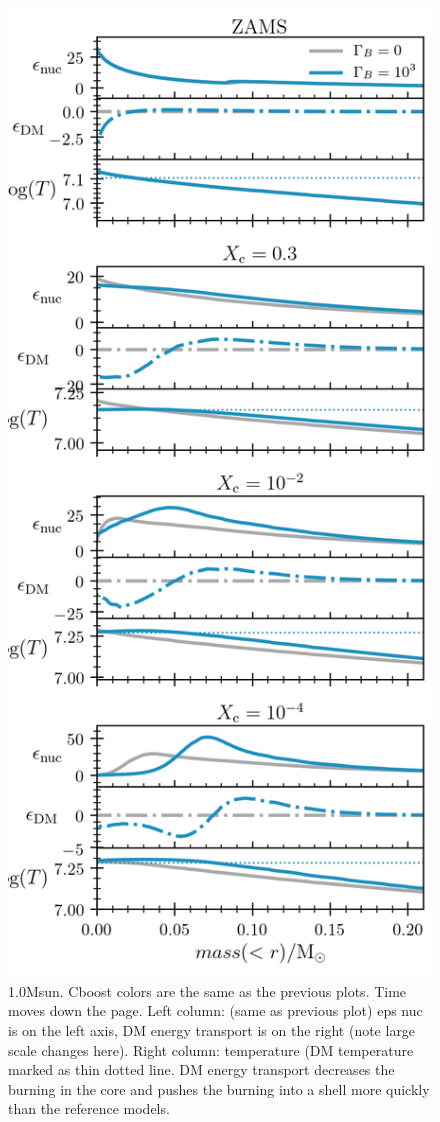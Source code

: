 \documentclass[useAMS,usenatbib]{mnras}
\begin{document}
  \begin{figure}
    \centering
    \includegraphics[width=\textwidth]{plots/m1p0c3.png}
    \caption{1.0Msun. Cboost colors are the same as the previous plots. Time moves down the page. Left column: (same as previous plot) eps nuc is on the left axis, DM energy transport is on the right (note large scale changes here). Right column: temperature (DM temperature marked as thin dotted line.
    DM energy transport decreases the burning in the core and pushes the burning into a shell more quickly than the reference models.
    }
    \label{fig:m1p0_a}
  \end{figure}
\end{document}

